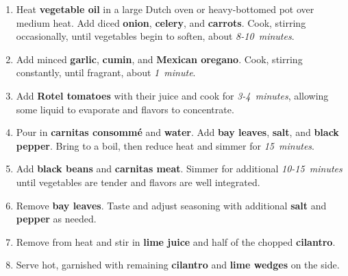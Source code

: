\documentclass[11pt,letterpaper]{article}
\begin{document}
\begin{enumerate}
    \item Heat \textbf{vegetable oil} in a large Dutch oven or heavy-bottomed pot over medium heat. Add diced \textbf{onion}, \textbf{celery}, and \textbf{carrots}. Cook, stirring occasionally, until vegetables begin to soften, about \textit{8-10~minutes}.
    
    \item Add minced \textbf{garlic}, \textbf{cumin}, and \textbf{Mexican oregano}. Cook, stirring constantly, until fragrant, about \textit{1~minute}.
    
    \item Add \textbf{Rotel tomatoes} with their juice and cook for \textit{3-4~minutes}, allowing some liquid to evaporate and flavors to concentrate.
    
    \item Pour in \textbf{carnitas consommé} and \textbf{water}. Add \textbf{bay leaves}, \textbf{salt}, and \textbf{black pepper}. Bring to a boil, then reduce heat and simmer for \textit{15~minutes}.
    
    \item Add \textbf{black beans} and \textbf{carnitas meat}. Simmer for additional \textit{10-15~minutes} until vegetables are tender and flavors are well integrated.
    
    \item Remove \textbf{bay leaves}. Taste and adjust seasoning with additional \textbf{salt} and \textbf{pepper} as needed.
    
    \item Remove from heat and stir in \textbf{lime juice} and half of the chopped \textbf{cilantro}.
    
    \item Serve hot, garnished with remaining \textbf{cilantro} and \textbf{lime wedges} on the side.
\end{enumerate}

\newpage
\end{document}
